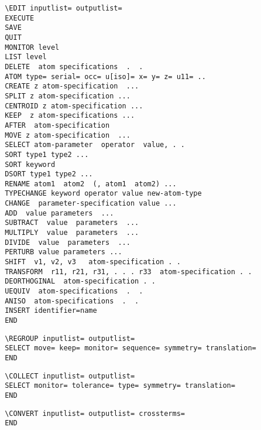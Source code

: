 \documentclass[10pt,a4paper]{report}
\begin{document}
\bigskip{}



\small\begin{verbatim}
 \EDIT inputlist= outputlist=
 EXECUTE
 SAVE
 QUIT
 MONITOR level
 LIST level
 DELETE  atom specifications  .  .
 ATOM type= serial= occ= u[iso]= x= y= z= u11= ..
 CREATE z atom-specification  ...
 SPLIT z atom-specification ...
 CENTROID z atom-specification ...
 KEEP  z atom-specifications ...
 AFTER  atom-specification
 MOVE z atom-specification  ...
 SELECT atom-parameter  operator  value, . .
 SORT type1 type2 ...
 SORT keyword
 DSORT type1 type2 ...
 RENAME atom1  atom2  (, atom1  atom2) ...
 TYPECHANGE keyword operator value new-atom-type
 CHANGE  parameter-specification value ...
 ADD  value parameters  ...
 SUBTRACT  value  parameters  ...
 MULTIPLY  value  parameters  ...
 DIVIDE  value  parameters  ...
 PERTURB value parameters ...
 SHIFT  v1, v2, v3   atom-specification . .
 TRANSFORM  r11, r21, r31, . . . r33  atom-specification . .
 DEORTHOGINAL  atom-specification . .
 UEQUIV  atom-specifications  .  .
 ANISO  atom-specifications  .  .
 INSERT identifier=name
 END
\end{verbatim}\normalsize




\bigskip{}



\small\begin{verbatim}
 \REGROUP inputlist= outputlist=
 SELECT move= keep= monitor= sequence= symmetry= translation=
 END
\end{verbatim}\normalsize




\bigskip{}



\small\begin{verbatim}
 \COLLECT inputlist= outputlist=
 SELECT monitor= tolerance= type= symmetry= translation=
 END
\end{verbatim}\normalsize




\bigskip{}



\small\begin{verbatim}
 \CONVERT inputlist= outputlist= crossterms=
 END
\end{verbatim}\normalsize
\end{document}
